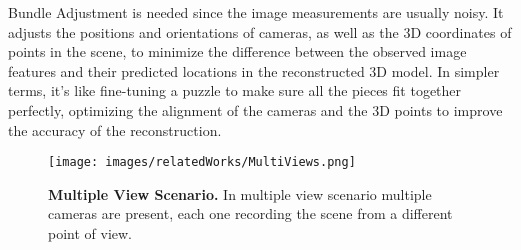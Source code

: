 Bundle Adjustment is needed since the image measurements are usually noisy. It adjusts the positions and orientations of cameras, as well as the 3D coordinates of
points in the scene, to minimize the difference between the observed image features and their predicted locations in the reconstructed 3D model. In simpler terms,
it's like fine-tuning a puzzle to make sure all the pieces fit together perfectly, optimizing the alignment of the cameras and the 3D points to improve the accuracy 
of the reconstruction.
\begin{figure}
    \centering
    \texttt{[image: images/relatedWorks/MultiViews.png]} %
    \caption{\textbf{Multiple View Scenario.} In multiple view scenario multiple cameras are present, each one recording the scene from a different point of view.}
    \label{fig:multiview}
\end{figure}


